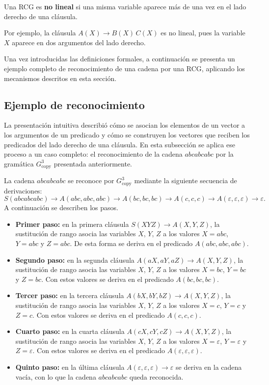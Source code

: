 \begin{definicion}
\label{def:no-lineal}
Una RCG es \textbf{no lineal} si una misma variable aparece más de una
vez en el lado derecho de una cláusula.
\end{definicion}

Por ejemplo, la cláusula $A(X) \to B(X)\, C(X)$ es no lineal, pues la
variable $X$ aparece en dos argumentos del lado derecho.

Una vez introducidas las definiciones formales, a continuación se
presenta un ejemplo completo de reconocimiento de una cadena por una
RCG, aplicando los mecanismos descritos en esta sección.

\subsection{Ejemplo de reconocimiento}

La presentación intuitiva describió cómo se asocian los elementos de
un vector a los argumentos de un predicado y cómo se construyen los
vectores que reciben los predicados del lado derecho de una cláusula.
En esta subsección se aplica ese proceso a un caso completo: el
reconocimiento de la cadena $abcabcabc$ por la gramática
$G_{\mathrm{copy}}^3$ presentada anteriormente.

La cadena $abcabcabc$ se reconoce por $G_{\mathrm{copy}}^3$ mediante
la siguiente secuencia de derivaciones:
\[
  S(abcabcabc) \to A(abc, abc, abc) \to A(bc, bc, bc) \to A(c, c, c)
  \to A(\varepsilon, \varepsilon, \varepsilon) \to \varepsilon.
\]
A continuación se describen los pasos.
\begin{itemize}
  \item \textbf{Primer paso:} en la primera cláusula
    $S(XYZ) \to A(X, Y, Z)$, la sustitución de rango asocia las
    variables $X$, $Y$, $Z$ a los valores $X = abc$, $Y = abc$ y
    $Z = abc$. De esta forma se deriva en el predicado $A(abc, abc,
    abc)$.
  \item \textbf{Segundo paso:} en la segunda cláusula
    $A(aX, aY, aZ) \to A(X, Y, Z)$, la sustitución de rango asocia las
    variables $X$, $Y$, $Z$ a los valores $X = bc$, $Y = bc$ y
    $Z = bc$. Con estos valores se deriva en el predicado
    $A(bc, bc, bc)$.
  \item \textbf{Tercer paso:} en la tercera cláusula
    $A(bX, bY, bZ) \to A(X, Y, Z)$, la sustitución de rango asocia las
    variables $X$, $Y$, $Z$ a los valores $X = c$, $Y = c$ y $Z = c$.
    Con estos valores se deriva en el predicado $A(c, c, c)$.
  \item \textbf{Cuarto paso:} en la cuarta cláusula
    $A(cX, cY, cZ) \to A(X, Y, Z)$, la sustitución de rango asocia las
    variables $X$, $Y$, $Z$ a los valores $X = \varepsilon$,
    $Y = \varepsilon$ y $Z = \varepsilon$. Con estos valores se deriva
    en el predicado $A(\varepsilon, \varepsilon, \varepsilon)$.
  \item \textbf{Quinto paso:} en la última cláusula
    $A(\varepsilon, \varepsilon, \varepsilon) \to \varepsilon$ se deriva
    en la cadena vacía, con lo que la cadena $abcabcabc$ queda
    reconocida.
\end{itemize}

